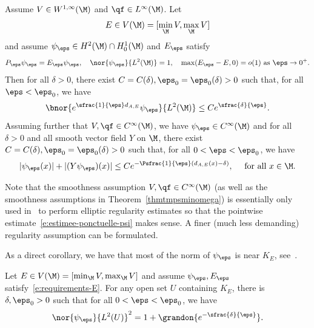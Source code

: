 \begin{theorem}
\label{t:decay-agmon}
Assume $V \in W^{1,\infty}(\M)$ and $\qf \in L^\infty(\M)$. Let
\[
E \in V(\M) = [\min_\M V, \max_\M V]
\]
and assume $\psi_\eps \in H^2(\M) \cap H^1_0(\M)$ and $E_\eps$ satisfy
\begin{equation}
\label{e:requirements-E}
P_\eps \psi_\eps = E_\eps \psi_\eps, \quad \nor{\psi_\eps}{L^2(\M)} = 1, \quad \max(E_\eps -E, 0) = o(1) \text{ as } \eps \to 0^+.
\end{equation}
Then for all $\delta>0$, there exist $C=C(\delta),\eps_0=\eps_0(\delta)>0$ such that, for all $\eps<\eps_0$, we have
\begin{equation}
\label{e:estimee-L2-psi}
\bnor{ e^{\sfrac{1}{\eps} d_{A,E}} \psi_\eps}{L^2(\M)}\leq C e^{\sfrac{\delta}{\eps}}.
\end{equation}
Assuming further that $V, \qf \in C^\infty(\M)$, we have $\psi_\eps \in C^\infty(\M)$ and for all $\delta>0$ and all smooth vector field $Y$ on $\M$, there exist $C=C(\delta),\eps_0=\eps_0(\delta)>0$ such that, for all $0<\eps<\eps_0$, we have
\begin{equation}
\label{e:estimee-ponctuelle-psi}
|\psi_\eps(x)| + |(Y\psi_\eps)(x)| \leq C e^{-\Psfrac{1}{\eps} (d_{A,E}(x)-\delta)}, \quad \text{ for all } x \in \M.
\end{equation}
\end{theorem}
\begin{remark}
\label{r:Cinfty-reg-bdry}
Note that the smoothness assumption $V, \qf \in C^\infty(\M)$ (as well as the smoothness assumptions in Theorem~\ref{thmtmpsminomega}) is essentially only used in~\cite{HS84,Helffer:booksemiclassic,DS:book} to perform elliptic regularity estimates so that the pointwise estimate~\eqref{e:estimee-ponctuelle-psi} makes sense. A finer (much less demanding) regularity assumption can be formulated.
\end{remark}

As a direct corollary, we have that most of the norm of $\psi_\eps$ is near $K_E$, see~\cite[Cor.\,3.3.2]{Helffer:booksemiclassic}.
\begin{corollary}
\label{corpresx0omega}
Let $E \in V(\M) = [\min_\M V, \max_\M V]$ and assume $\psi_\eps, E_\eps$ satisfy~\eqref{e:requirements-E}.
For any open set $U$ containing $K_E$, there is $\delta, \eps_0 >0$ such that for all $0<\eps< \eps_0$, we have
\[
\nor{\psi_\eps}{L^2(U)}^2 = 1 + \grandon{e^{-\sfrac{\delta}{\eps}}}.
\]
\end{corollary}

